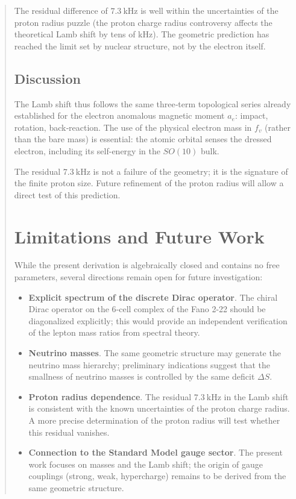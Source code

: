 \documentclass[12pt]{article}
\begin{document}
\begin{abstract}
The residual difference of \(7.3\ \text{kHz}\) is well within the uncertainties of the proton radius puzzle (the proton charge radius controversy affects the theoretical Lamb shift by tens of kHz). The geometric prediction has reached the limit set by nuclear structure, not by the electron itself.

\subsection{Discussion}

The Lamb shift thus follows the same three‑term topological series already established for the electron anomalous magnetic moment \(a_e\): impact, rotation, back‑reaction. The use of the physical electron mass in \(f_v\) (rather than the bare mass) is essential: the atomic orbital senses the dressed electron, including its self-energy in the \(SO(10)\) bulk.

The residual \(7.3\ \text{kHz}\) is not a failure of the geometry; it is the signature of the finite proton size. Future refinement of the proton radius will allow a direct test of this prediction.

\section{Limitations and Future Work}

While the present derivation is algebraically closed and contains no free parameters, several directions remain open for future investigation:

\begin{itemize}
  \item \textbf{Explicit spectrum of the discrete Dirac operator}. The chiral Dirac operator on the 6‑cell complex of the Fano 2-22 should be diagonalized explicitly; this would provide an independent verification of the lepton mass ratios from spectral theory.
  \item \textbf{Neutrino masses}. The same geometric structure may generate the neutrino mass hierarchy; preliminary indications suggest that the smallness of neutrino masses is controlled by the same deficit \(\Delta S\).
  \item \textbf{Proton radius dependence}. The residual \(7.3\ \text{kHz}\) in the Lamb shift is consistent with the known uncertainties of the proton charge radius. A more precise determination of the proton radius will test whether this residual vanishes.
  \item \textbf{Connection to the Standard Model gauge sector}. The present work focuses on masses and the Lamb shift; the origin of gauge couplings (strong, weak, hypercharge) remains to be derived from the same geometric structure.
\end{itemize}


\end{abstract}
\end{document}
